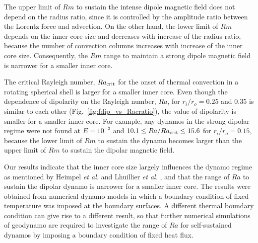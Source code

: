 {\color{blue}
The upper limit of $Rm$ to sustain the intense dipole magnetic field does not depend on the radius ratio, since it is controlled by the amplitude ratio between the Lorentz force and advection. 
On the other hand, the lower limit of $Rm$ depends on the inner core size and decreases with increase of the radius ratio, because the number of convection columns increases with increase of the inner core size. 
}
{\color{blue}
Consequently, 
}
{\color{red}
the $Rm$ range to maintain a strong dipole magnetic field is narrower for a smaller inner core.
}

{\color{red}
The critical Rayleigh number, $Ra_{\rm crit}$ for the onset of thermal convection in a rotating spherical shell is larger for a smaller inner core.
Even though the dependence of dipolarity on the Rayleigh number, $Ra$, for $r_i / r_o = 0.25$ and $0.35$ is similar to each other (Fig.~\ref{fig:fdip_vs_Racratio}), the value of dipolarity is smaller for a smaller inner core.
For example, any dynamos in the strong dipolar regime were not found at $E = 10^{-3}$ and $10.1 \le Ra / Ra_{\rm crit} \le 15.6$ for $r_i / r_o = 0.15$, 
{\color{blue} 
because the lower limit of $Rm$ to sustain the dynamo becomes larger than the upper limit of $Rm$ to sustain the dipolar magnetic field. 
}
}

{\color{red}
Our results indicate that the inner core size largely influences the dynamo regime as mentioned by Heimpel {\it et al.}  and Lhuillier {\it et al.} , and that the range of $Ra$ to sustain the dipolar dynamo is narrower for a smaller inner core.
The results were obtained from numerical dynamo models in which a boundary condition of fixed temperature was imposed at the boundary surfaces.
A different thermal boundary condition can give rise to a different result, so that further numerical simulations of geodynamo are required to investigate the range of $Ra$ for self-sustained dynamos by imposing a boundary condition of fixed heat flux.
}


